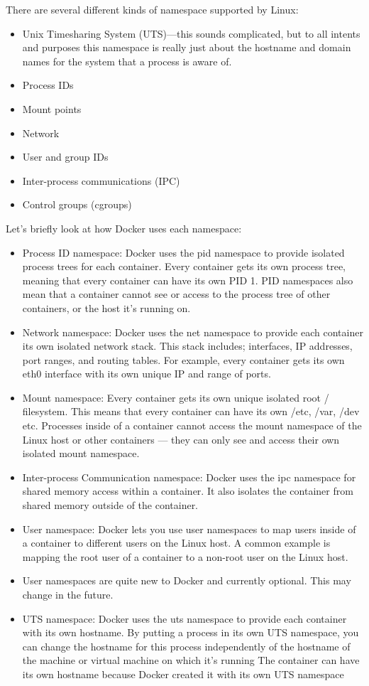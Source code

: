 There are several different kinds of namespace supported by Linux:
\begin{itemize}
    \item Unix Timesharing System (UTS)—this sounds complicated, but to all intents and purposes this namespace is really just about the hostname and domain names for the system that a process is aware of.
    \item Process IDs
    \item Mount points
    \item Network
    \item User and group IDs
    \item Inter-process communications (IPC)
    \item  Control groups (cgroups)
\end{itemize}

Let's briefly look at how Docker uses each namespace:
\begin{itemize}
    \item Process ID namespace: Docker uses the pid namespace to provide isolated process trees for each container. Every container gets its own process tree, meaning that every container can have its own PID 1. PID namespaces also mean that a container cannot see or access to the process tree of other containers, or the host it's running on.
    \item Network namespace: Docker uses the net namespace to provide each container its own isolated network stack. This stack includes; interfaces, IP addresses, port ranges, and routing tables. For example, every container gets its own eth0 interface with its own unique IP and range of ports.
    \item Mount namespace: Every container gets its own unique isolated root / filesystem. This means that every container can have its own /etc, /var, /dev etc. Processes inside of a container cannot access the mount namespace of the Linux host or other containers — they can only see and access their own isolated mount namespace.
    \item Inter-process Communication namespace: Docker uses the ipc namespace for shared memory access within a container. It also isolates the container from shared memory outside of the container.
    \item User namespace: Docker lets you use user namespaces to map users inside of a container to different users on the Linux host. A common example is mapping the root user of a container to a non-root user on the Linux host.
    \item User namespaces are quite new to Docker and currently optional. This may change in the future.
    \item UTS namespace: Docker uses the uts namespace to provide each container with its own hostname.  By putting a process in its own UTS namespace, you can change the hostname for this process independently of the hostname of the machine or virtual machine on which it's running The container can have its own hostname because Docker created it with its own UTS namespace
\end{itemize}

